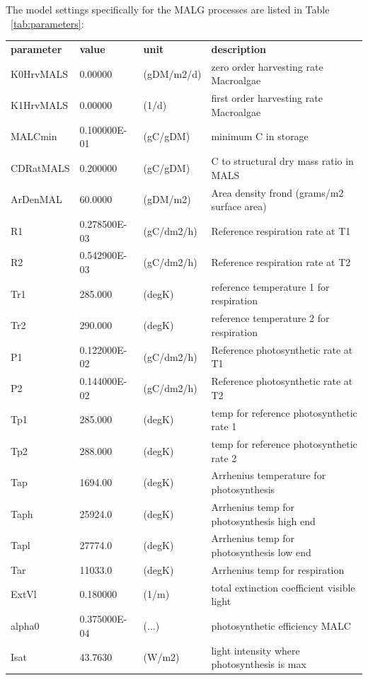 \documentclass{deltares_manual}
\begin{document}
The model settings specifically for the MALG processes are listed in Table ~\ref{tab:parameters}:

\begin{longtable}{|l|l|l|l|}

		\hline
		\textbf{parameter} & 	\textbf{value} & 	\textbf{unit} & 	\textbf{description}\\ 
	K0HrvMALS & 0.00000 & (gDM/m2/d) & zero order harvesting rate Macroalgae\\ 
	K1HrvMALS & 0.00000 & (1/d) & first order harvesting rate Macroalgae\\ 
	MALCmin & 0.100000E-01 & (gC/gDM) & minimum C in storage\\ 
	CDRatMALS & 0.200000 & (gC/gDM) & C to structural dry mass ratio in MALS\\ 
	ArDenMAL & 60.0000 & (gDM/m2) & Area density frond (grams/m2 surface area)\\ 
	R1 & 0.278500E-03 & (gC/dm2/h) & Reference respiration rate at T1\\ 
	R2 & 0.542900E-03 & (gC/dm2/h) & Reference respiration rate at T2\\ 
	Tr1 & 285.000 & (degK) & reference temperature 1 for respiration\\ 
	Tr2 & 290.000 & (degK) & reference temperature 2 for respiration\\ 
	P1 & 0.122000E-02 & (gC/dm2/h) & Reference photosynthetic rate at T1\\ 
	P2 & 0.144000E-02 & (gC/dm2/h) & Reference photosynthetic rate at T2\\ 
	Tp1 & 285.000 & (degK) & temp for reference photosynthetic rate 1\\ 
	Tp2 & 288.000 & (degK) & temp for reference photosynthetic rate 2\\ 
	Tap & 1694.00 & (degK) & Arrhenius temperature for photosynthesis\\ 
	Taph & 25924.0 & (degK) & Arrhenius temp for photosynthesis high end\\ 
	Tapl & 27774.0 & (degK) & Arrhenius temp for photosynthesis low end\\ 
	Tar & 11033.0 & (degK) & Arrhenius temp for respiration\\ 
	ExtVl & 0.180000 & (1/m) & total extinction coefficient visible light\\ 
	alpha0 & 0.375000E-04 & (...) & photosynthetic efficiency MALC\\ 
	Isat & 43.7630 & (W/m2) & light intensity where photosynthesis is max\\ 

\end{longtable}
\end{document}
